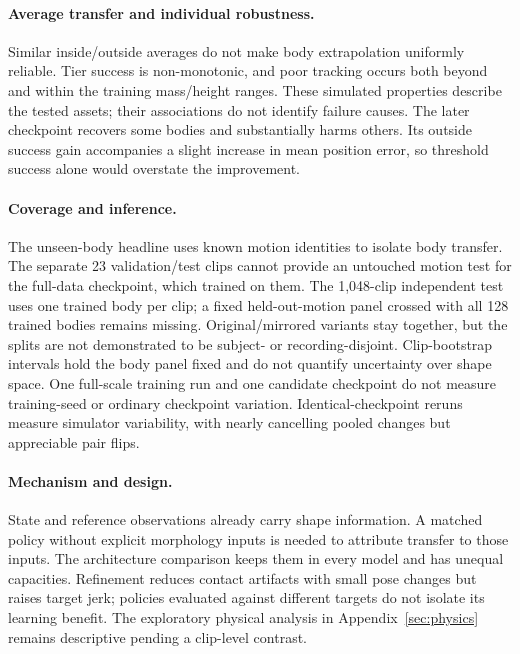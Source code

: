\documentclass[11pt]{article}
\begin{document}
\paragraph{Average transfer and individual robustness.}
Similar inside/outside averages do not make body extrapolation uniformly
reliable. Tier success is non-monotonic, and poor tracking occurs both beyond
and within the training mass/height ranges. These simulated properties
describe the tested assets; their associations do not identify failure causes.
The later checkpoint recovers some bodies and substantially harms others.
Its outside success gain accompanies a slight increase in mean position
error, so threshold success alone would overstate the improvement.

\paragraph{Coverage and inference.}
The unseen-body headline uses known motion identities to isolate body
transfer. The separate 23 validation/test clips cannot provide an untouched
motion test for the full-data checkpoint, which trained on them. The
1,048-clip independent test uses one trained body per clip; a fixed
held-out-motion panel crossed with all 128 trained bodies remains missing.
Original/mirrored variants stay together, but the splits are not demonstrated
to be subject- or recording-disjoint. Clip-bootstrap intervals hold the body
panel fixed and do not quantify uncertainty over shape space. One full-scale
training run and one candidate checkpoint do not measure training-seed or
ordinary checkpoint variation. Identical-checkpoint reruns measure simulator
variability, with nearly cancelling pooled changes but appreciable pair flips.

\paragraph{Mechanism and design.}
State and reference observations already carry shape information. A matched
policy without explicit morphology inputs is needed to attribute transfer to
those inputs. The architecture comparison keeps them in every model and has
unequal capacities. Refinement reduces contact artifacts with small pose
changes but raises target jerk; policies evaluated against different targets
do not isolate its learning benefit. The exploratory physical analysis in
Appendix~\ref{sec:physics} remains descriptive pending a clip-level contrast.
\end{document}
